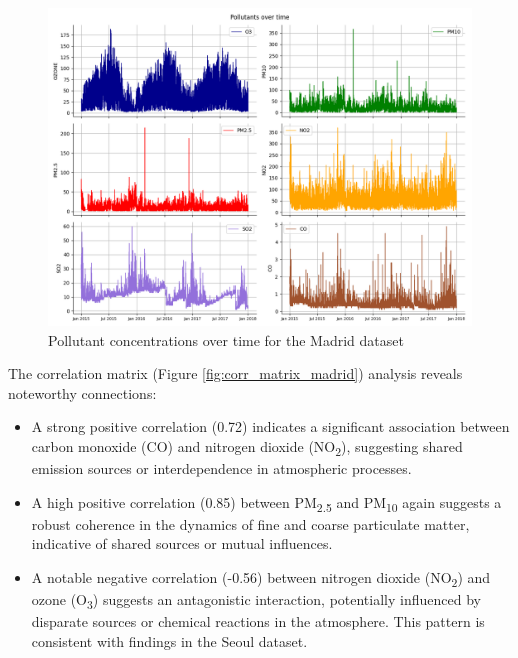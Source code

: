 \begin{figure}[h]
    \centering
    \includegraphics[width=1\linewidth]{images/ts_madrid.png}
    \caption{Pollutant concentrations over time for the Madrid dataset}
    \label{fig:ts_madrid}
\end{figure}

The correlation matrix (Figure \ref{fig:corr_matrix_madrid}) analysis reveals noteworthy connections: 
\begin{itemize}
    \item  A strong positive correlation (0.72) indicates a significant association between carbon monoxide (CO) and nitrogen dioxide (NO\textsubscript{2}), suggesting shared emission sources or interdependence in atmospheric processes.
    \item A high positive correlation (0.85) between PM\textsubscript{2.5} and PM\textsubscript{10} again suggests a robust coherence in the dynamics of fine and coarse particulate matter, indicative of shared sources or mutual influences.
    \item A notable negative correlation (-0.56) between nitrogen dioxide (NO\textsubscript{2}) and ozone (O\textsubscript{3}) suggests an antagonistic interaction, potentially influenced by disparate sources or chemical reactions in the atmosphere. This pattern is consistent with findings in the Seoul dataset.
\end{itemize}

